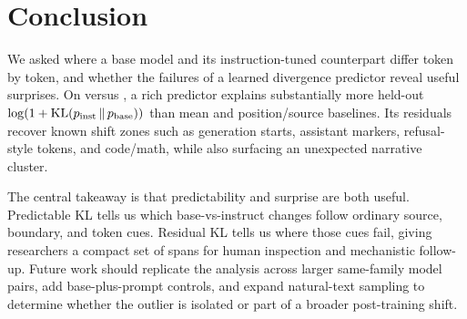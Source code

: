 \section{Conclusion}
\label{sec:conclusion}

We asked where a base model and its instruction-tuned counterpart differ token by token, and whether the failures of a learned divergence predictor reveal useful surprises. On \qwenbase versus \qweninstruct, a rich predictor explains substantially more held-out $\log(1+\mathrm{KL}\!\left(p_{\mathrm{inst}}\,\Vert\,p_{\mathrm{base}}\right))$ than mean and position/source baselines. Its residuals recover known shift zones such as generation starts, assistant markers, refusal-style tokens, and code/math, while also surfacing an unexpected \wikitext narrative cluster.

The central takeaway is that predictability and surprise are both useful. Predictable KL tells us which base-vs-instruct changes follow ordinary source, boundary, and token cues. Residual KL tells us where those cues fail, giving researchers a compact set of spans for human inspection and mechanistic follow-up. Future work should replicate the analysis across larger same-family model pairs, add base-plus-prompt controls, and expand natural-text sampling to determine whether the \wikitext outlier is isolated or part of a broader post-training shift.
